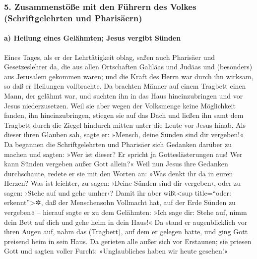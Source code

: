 \hypertarget{zusammenstuxf6uxdfe-mit-den-fuxfchrern-des-volkes-schriftgelehrten-und-pharisuxe4ern}{%
\subsubsection{5. Zusammenstöße mit den Führern des Volkes
(Schriftgelehrten und
Pharisäern)}\label{zusammenstuxf6uxdfe-mit-den-fuxfchrern-des-volkes-schriftgelehrten-und-pharisuxe4ern}}

\hypertarget{a-heilung-eines-geluxe4hmten-jesus-vergibt-suxfcnden}{%
\paragraph{a) Heilung eines Gelähmten; Jesus vergibt
Sünden}\label{a-heilung-eines-geluxe4hmten-jesus-vergibt-suxfcnden}}

 Eines Tages, als er der Lehrtätigkeit oblag, saßen auch
Pharisäer und Gesetzeslehrer da, die aus allen Ortschaften Galiläas und
Judäas und (besonders) aus Jerusalem gekommen waren; und die Kraft des
Herrn war durch ihn wirksam, so daß er Heilungen vollbrachte.
 Da brachten Männer auf einem Tragbett einen Mann, der
gelähmt war, und suchten ihn in das Haus hineinzubringen und vor Jesus
niederzusetzen.  Weil sie aber wegen der Volksmenge keine
Möglichkeit fanden, ihn hineinzubringen, stiegen sie auf das Dach und
ließen ihn samt dem Tragbett durch die Ziegel hindurch mitten unter die
Leute vor Jesus hinab.  Als dieser ihren Glauben sah,
sagte er: »Mensch, deine Sünden sind dir vergeben!«  Da
begannen die Schriftgelehrten und Pharisäer sich Gedanken darüber zu
machen und sagten: »Wer ist dieser? Er spricht ja Gotteslästerungen aus!
Wer kann Sünden vergeben außer Gott allein?«  Weil nun
Jesus ihre Gedanken durchschaute, redete er sie mit den Worten an: »Was
denkt ihr da in euren Herzen?  Was ist leichter, zu
sagen: ›Deine Sünden sind dir vergeben‹, oder zu sagen: ›Stehe auf und
gehe umher‹?  Damit ihr aber wißt\textless sup
title=``oder: erkennt''\textgreater✲, daß der Menschensohn Vollmacht
hat, auf der Erde Sünden zu vergeben« -- hierauf sagte er zu dem
Gelähmten: »Ich sage dir: Stehe auf, nimm dein Bett auf dich und gehe
heim in dein Haus!«  Da stand er augenblicklich vor ihren
Augen auf, nahm das (Tragbett), auf dem er gelegen hatte, und ging Gott
preisend heim in sein Haus.  Da gerieten alle außer sich
vor Erstaunen; sie priesen Gott und sagten voller Furcht: »Unglaubliches
haben wir heute gesehen!«

